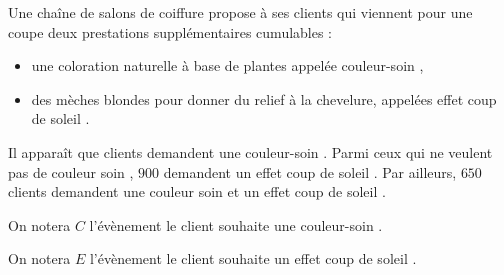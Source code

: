 \medskip

Une chaîne de salons de coiffure propose à ses  clients qui viennent pour une
coupe deux prestations supplémentaires cumulables :

\begin{itemize}
\item  une coloration naturelle à base de plantes appelée \og couleur-soin \fg,
\item des mèches blondes pour donner du relief à la chevelure, appelées \og effet
coup de soleil \fg.
\end{itemize}

Il apparaît que  clients demandent une \og couleur-soin \fg. Parmi ceux qui ne
veulent pas de \og couleur soin \fg, $900$ demandent un \og effet coup de soleil \fg. Par
ailleurs, $650$ clients demandent une \og couleur soin \fg et un \og effet coup de soleil \fg.

On notera $C$ l'évènement \og le client souhaite une \og couleur-soin \fg.

On notera $E$ l'évènement \og le client souhaite un \og effet coup de soleil \fg.

